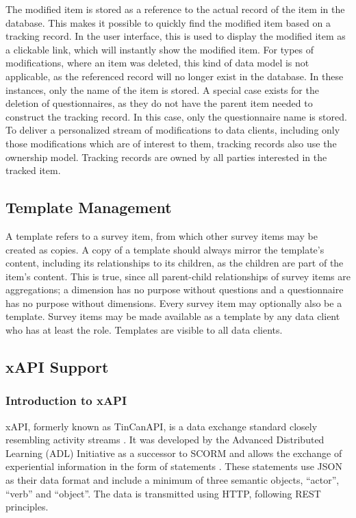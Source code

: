     The modified item is stored as a reference to the actual record of the item in the database.
    This makes it possible to quickly find the modified item based on
    a tracking record. In the user interface, this is used to display the
    modified item as a clickable link, which will instantly show the modified item.
    For types of modifications, where an item was deleted, this 
    kind of data model is not applicable, as the referenced record will no longer 
    exist in the database. In these instances, only the name of
    the item is stored. A special case exists for the deletion of questionnaires,
    as they do not have the parent item needed to construct the tracking record.
    In this case, only the questionnaire name is stored.
    To deliver a personalized stream of modifications to data clients,
    including only those modifications which are of interest to them,
    tracking records also use the ownership model.
    Tracking records are owned by all parties interested in the tracked
    item.

\subsection{Template Management}
    A template refers to a survey item, from which other survey items
    may be created as copies. A copy of a template should always
    mirror the template's content, including its relationships
    to its children, as the children are part of the item's content.
    This is true, since all parent-child relationships 
    of survey items are aggregations; a dimension has no purpose
    without questions and a questionnaire has no purpose
    without dimensions. Every survey item may optionally also
    be a template. Survey items may be made available as a template by 
    any data client who has at least the  role.
    Templates are visible to all data clients.


\subsection{xAPI Support}
    \subsubsection{Introduction to xAPI}
        xAPI, formerly known as TinCanAPI, is a data exchange
        standard closely resembling activity streams \cite{activity-streams}.
        It was developed by the Advanced Distributed Learning (ADL) Initiative
        as a successor to SCORM \cite{scorm,xapi-history} and allows the exchange of experiential
        information in the form of statements \cite{xapi-object-model}. These statements
        use JSON as their data format and include a minimum of three
        semantic objects, ``actor'', ``verb'' and ``object''. 
        The data is transmitted using HTTP, following REST principles.

